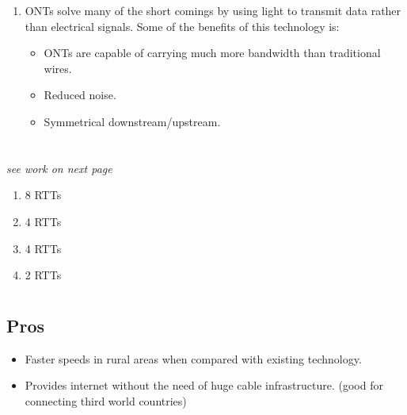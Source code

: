 \documentclass{article}
\begin{document}
\begin{enumerate}[label=(\alph*)]
	\item 
        ONTs solve many of the short comings by using light to transmit data rather than electrical signals.
        Some of the benefits of this technology is:
        \begin{itemize}
            \item ONTs are capable of carrying much more bandwidth than traditional wires.
            \item Reduced noise.
            \item Symmetrical downstream/upstream.
        \end{itemize}
\end{enumerate}
%
\newpage
\section{}
\emph{see work on next page}
\begin{enumerate}[label=(\alph*)]
    \item 8 RTTs
    \item 4 RTTs
    \item 4 RTTs
    \item 2 RTTs
\end{enumerate}
\section{}

\subsection{Pros}
\begin{itemize}
    \item Faster speeds in rural areas when compared with existing technology. 
    \item Provides internet without the need of huge cable infrastructure. (good for connecting 
        third world countries)
\end{itemize}
\end{document}
